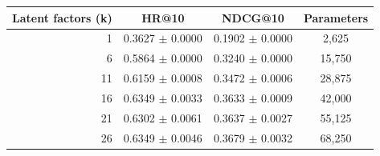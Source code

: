 \begin{tabular}{rccc}
\toprule
Latent factors (k) & HR@10 & NDCG@10 & Parameters \\
\midrule
1 & 0.3627 $\pm$ 0.0000 & 0.1902 $\pm$ 0.0000 & 2,625 \\
6 & 0.5864 $\pm$ 0.0000 & 0.3240 $\pm$ 0.0000 & 15,750 \\
11 & 0.6159 $\pm$ 0.0008 & 0.3472 $\pm$ 0.0006 & 28,875 \\
16 & 0.6349 $\pm$ 0.0033 & 0.3633 $\pm$ 0.0009 & 42,000 \\
21 & 0.6302 $\pm$ 0.0061 & 0.3637 $\pm$ 0.0027 & 55,125 \\
26 & 0.6349 $\pm$ 0.0046 & 0.3679 $\pm$ 0.0032 & 68,250 \\
\bottomrule
\end{tabular}